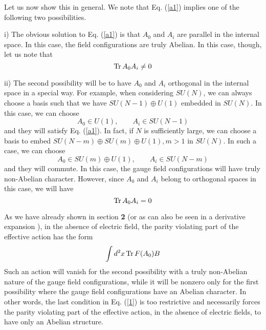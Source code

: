 \documentclass[a4paper,12pt]{article}
\begin{document}
Let us now show this in general. We note that Eq. (\ref{a1}) implies
one of the following two possibilities.

i) The obvious solution to Eq. (\ref{a1}) is that $A_{0}$ and $A_{i}$
are parallel in the internal space. In this case, the field
configurations are truly Abelian. In this case, though, let us note
that
\begin{equation}
{\rm Tr}\, A_{0}A_{i} \neq 0\label{a2}
\end{equation}

ii) The second possibility will be to have $A_{0}$ and $A_{i}$
orthogonal in the internal space in a special way. For example, when
considering $SU(N)$, we can always choose a basis such that we have
$SU(N-1)\oplus U(1)$ embedded in $SU(N)$. In this case, we can choose
\begin{equation}
A_{0}\in U(1),\qquad A_{i}\in SU(N-1)\label{a3}
\end{equation}
 and they will satisfy Eq. (\ref{a1}). In fact, if $N$ is sufficiently
 large, we can choose a basis to embed $SU(N-m)\oplus SU(m)\oplus
 U(1), m>1$
 in $SU(N)$. In such a case, we can choose
\begin{equation}
A_{0}\in SU(m)\oplus U(1),\qquad A_{i}\in SU(N-m)\label{a4}
\end{equation}
and they will commute. In this case, the gauge field configurations
will have truly non-Abelian character. However, since $A_{0}$ and
$A_{i}$ belong to orthogonal spaces in this case, we will have
\begin{equation}
{\rm Tr}\, A_{0}A_{i} = 0\label{a5}
\end{equation}

As we have already shown in section {\bf 2} (or as can also be seen in a
derivative expansion \cite{Aitchison:1985pp,das:1987yb}), 
in the absence of electric field, the parity
violating part of the effective action has the form
\begin{equation}
\int d^{2}x\,{\rm Tr}\, F(A_{0}) B\label{a6}
\end{equation}
Such an action will vanish for the second possibility with a truly
non-Abelian nature of the gauge field configurations, while it will be
nonzero only for the first possibility where the gauge field
configurations have an Abelian character. In other words, the last
condition in Eq. (\ref{1}) is too restrictive and necessarily forces
the parity violating part of the effective action, in the absence of
electric fields, to have only an Abelian structure. 
\end{document}
